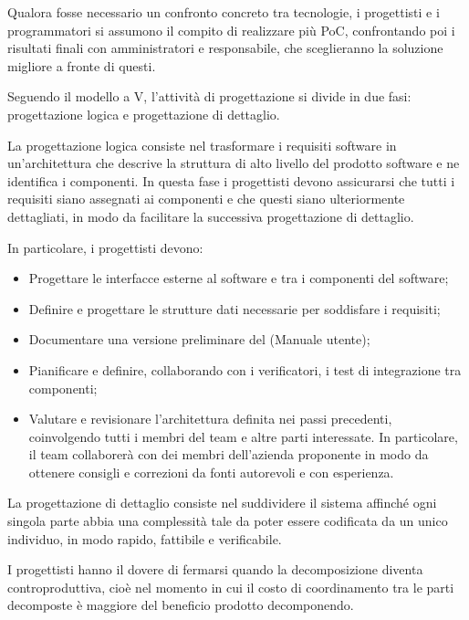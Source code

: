\documentclass[10pt, a4paper]{article}
\begin{document}
Qualora fosse necessario un confronto concreto tra tecnologie, i progettisti e i programmatori si assumono il compito di realizzare più PoC, confrontando poi i risultati finali con amministratori e responsabile, che sceglieranno la soluzione migliore a fronte di questi.

Seguendo il modello a V, l'attività di progettazione si divide in due fasi: progettazione logica e progettazione di dettaglio.

La progettazione logica consiste nel trasformare i requisiti software in un'architettura che descrive la struttura di alto livello del prodotto software e ne identifica i componenti.
In questa fase i progettisti devono assicurarsi che tutti i requisiti siano assegnati ai componenti e che questi siano ulteriormente dettagliati, in modo da facilitare la successiva progettazione di dettaglio.

In particolare, i progettisti devono:
\begin{itemize}
    \item Progettare le interfacce esterne al software e tra i componenti del software;
    \item Definire e progettare le strutture dati necessarie per soddisfare i requisiti;
    \item Documentare una versione preliminare del (Manuale utente);
    \item Pianificare e definire, collaborando con i verificatori, i test di integrazione tra componenti;
    \item Valutare e revisionare l'architettura definita nei passi precedenti, coinvolgendo tutti i membri del team e altre parti interessate. In particolare, il team collaborerà con dei membri dell'azienda proponente in modo da ottenere consigli e correzioni da fonti autorevoli e con esperienza.
\end{itemize}

\label{sec:progettazione_di_dettaglio}
La progettazione di dettaglio consiste nel suddividere il sistema affinché ogni singola parte abbia una complessità tale da poter essere codificata da un unico individuo, in modo rapido, fattibile e verificabile.

I progettisti hanno il dovere di fermarsi quando la decomposizione diventa controproduttiva, cioè nel momento in cui il costo di coordinamento tra le parti decomposte è maggiore del beneficio prodotto decomponendo.
\end{document}
